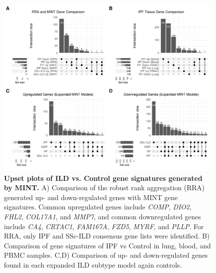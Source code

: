 \documentclass[
]{article}
\begin{document}
\begin{figure}

{\centering \includegraphics[width=1\linewidth,]{./Figures/SysReview/FigE3_upset} 

}

\caption[Upset plot of models]{\textbf{Upset plots of ILD vs. Control gene signatures generated by MINT.} A) Comparison of the robust rank aggregation (RRA) generated up- and down-regulated genes with MINT gene signatures. Common upregulated genes include \textit{COMP}, \textit{DIO2}, \textit{FHL2}, \textit{COL17A1}, and \textit{MMP7}, and common downregulated genes include \textit{CA4}, \textit{CRTAC1}, \textit{FAM167A}, \textit{FZD5}, \textit{MYRF}, and \textit{PLLP}. For RRA, only IPF and SSc-ILD consensus gene lists were identified. B) Comparison of gene signatures of IPF vs Control in lung, blood, and PBMC samples. C,D) Comparison of up- and down-regulated genes found in each expanded ILD subtype model again controls.}\label{fig:modelUpset}
\end{figure}
\end{document}
